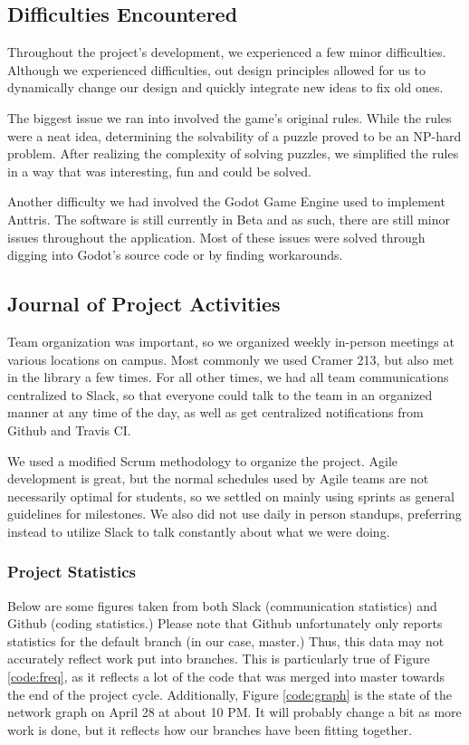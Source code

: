 \documentclass[12pt]{article}
\begin{document}
\subsection{Difficulties Encountered} %
Throughout the project's development, we experienced a few minor difficulties. Although we experienced difficulties, out design principles allowed for us to dynamically change our design and quickly integrate new ideas to fix old ones.

The biggest issue we ran into involved the game's original rules. While the rules were a neat idea, determining the solvability of a puzzle proved to be an NP-hard problem. After realizing the complexity of solving puzzles, we simplified the rules in a way that was interesting, fun and could be solved.

Another difficulty we had involved the Godot Game Engine used to implement Anttris. The software is still currently in Beta and as such, there are still minor issues throughout the application. Most of these issues were solved through digging into Godot's source code or by finding workarounds.
\subsection{Journal of Project Activities} %
Team organization was important, so we organized weekly in-person meetings at various locations on campus. Most commonly we used Cramer 213, but also met in the library a few times. For all other times, we had all team communications centralized to Slack, so that everyone could talk to the team in an organized manner at any time of the day, as well as get centralized notifications from Github and Travis CI. 

We used a modified Scrum methodology to organize the project. Agile development is great, but the normal schedules used by Agile teams are not necessarily optimal for students, so we settled on mainly using sprints as general guidelines for milestones. We also did not use daily in person standups, preferring instead to utilize Slack to talk constantly about what we were doing. 

\subsubsection{Project Statistics}
Below are some figures taken from both Slack (communication statistics) and Github (coding statistics.) Please note that Github unfortunately only reports statistics for the default branch (in our case, master.) Thus, this data may not accurately reflect work put into branches. This is particularly true of Figure \ref{code:freq}, as it reflects a lot of the code that was merged into master towards the end of the project cycle. Additionally, Figure \ref{code:graph} is the state of the network graph on April 28 at about 10 PM. It will probably change a bit as more work is done, but it reflects how our branches have been fitting together. 
\end{document}
